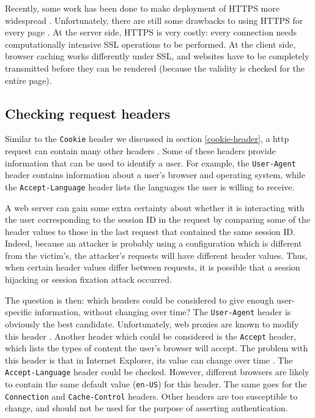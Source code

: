 Recently, some work has been done to make deployment of HTTPS more widespread \cite{Hodges2010,Jackson2008}. Unfortunately, there are still some drawbacks to using HTTPS for every page \cite{Adida2008}. At the server side, HTTPS is very costly: every connection needs computationally intensive SSL operations to be performed. At the client side, browser caching works differently under SSL, and websites have to be completely transmitted before they can be rendered (because the validity is checked for the entire page).

\subsection{Checking request headers}

Similar to the \texttt{Cookie} header we discussed in section \ref{cookie-header}, a \gls{http} request can contain many other headers \cite{rfc2616}. Some of these headers provide information that can be used to identify a user. For example, the \texttt{User-Agent} header contains information about a user's browser and operating system, while the \texttt{Accept-Language} header lists the languages the user is willing to receive.

A web server can gain some extra certainty about whether it is interacting with the user corresponding to the session ID in the request by comparing some of the header values to those in the last request that contained the same session ID. Indeed, because an attacker is probably using a configuration which is different from the victim's, the attacker's requests will have different header values. Thus, when certain header values differ between requests, it is possible that a session hijacking or session fixation attack occurred.

The question is then: which headers could be considered to give enough user-specific information, without changing over time? The \texttt{User-Agent} header is obviously the best candidate. Unfortunately, web proxies are known to modify this header \cite{ShiflettHijacking}. Another header which could be considered is the \texttt{Accept} header, which lists the types of content the user's browser will accept. The problem with this header is that in Internet Explorer, its value can change over time \cite{ShiflettHijacking}. The \texttt{Accept-Language} header could be checked. However, different browsers are likely to contain the same default value (\texttt{en-US}) for this header. The same goes for the \texttt{Connection} and \texttt{Cache-Control} headers. Other headers are too susceptible to change, and should not be used for the purpose of asserting authentication.


